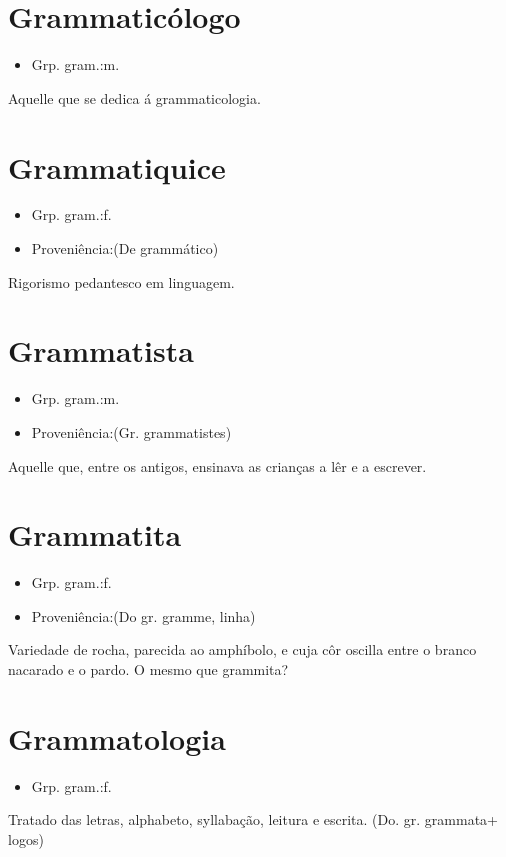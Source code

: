 \section{Grammaticólogo}
\begin{itemize}
\item {Grp. gram.:m.}
\end{itemize}
Aquelle que se dedica á grammaticologia.
\section{Grammatiquice}
\begin{itemize}
\item {Grp. gram.:f.}
\end{itemize}
\begin{itemize}
\item {Proveniência:(De \textunderscore grammático\textunderscore )}
\end{itemize}
Rigorismo pedantesco em linguagem.
\section{Grammatista}
\begin{itemize}
\item {Grp. gram.:m.}
\end{itemize}
\begin{itemize}
\item {Proveniência:(Gr. \textunderscore grammatistes\textunderscore )}
\end{itemize}
Aquelle que, entre os antigos, ensinava as crianças a lêr e a escrever.
\section{Grammatita}
\begin{itemize}
\item {Grp. gram.:f.}
\end{itemize}
\begin{itemize}
\item {Proveniência:(Do gr. \textunderscore gramme\textunderscore , linha)}
\end{itemize}
Variedade de rocha, parecida ao amphíbolo, e cuja côr oscilla entre o branco nacarado e o pardo.
O mesmo que \textunderscore grammita\textunderscore ?
\section{Grammatologia}
\begin{itemize}
\item {Grp. gram.:f.}
\end{itemize}
Tratado das letras, alphabeto, syllabação, leitura e escrita.
(Do. gr. \textunderscore grammata\textunderscore  + \textunderscore logos\textunderscore )
